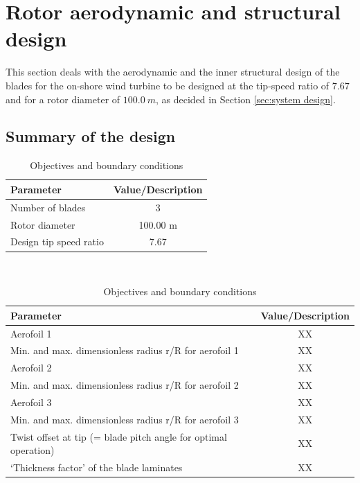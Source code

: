 \section{Rotor aerodynamic and structural design} \label{sec:rotor design}
This section deals with the aerodynamic and the inner structural design of the blades for the on-shore wind turbine to be designed at the tip-speed ratio of $7.67$ and for a rotor diameter of $100.0\ m$, as decided in Section \ref{sec:system design}.

\subsection{Summary of the design}

\begin{table}[H]
\begin{center} 
\caption{Objectives and boundary conditions}\label{tab:rotordesign2}
\begin{tabular}{ |l|c| } 
\hline
\textbf{Parameter} & \textbf{Value/Description}  \\ 
\hline
Number of blades & 3  \\ 
\hline
Rotor diameter & 100.00 m \\ 
\hline
Design tip speed ratio & 7.67 \\
\hline
\end{tabular} \\
\end{center}
\end{table}

\begin{table}[H]
\begin{center} 
\caption{Objectives and boundary conditions}\label{tab:rotordesign2}
\begin{tabular}{ |l|c| } 
\hline
\textbf{Parameter} & \textbf{Value/Description}  \\ 
\hline
Aerofoil 1 & XX  \\ 
\hline
Min. and max. dimensionless radius r/R for aerofoil 1 & XX \\ 
\hline
Aerofoil 2 & XX \\
\hline
Min. and max. dimensionless radius r/R for aerofoil 2 & XX \\
\hline
Aerofoil 3 & XX \\
\hline
Min. and max. dimensionless radius r/R for aerofoil 3 & XX \\
\hline
Twist offset at tip (= blade pitch angle for optimal operation) & XX \\
\hline
‘Thickness factor’ of the blade laminates & XX \\
\hline
\end{tabular} \\
\end{center}
\end{table}


